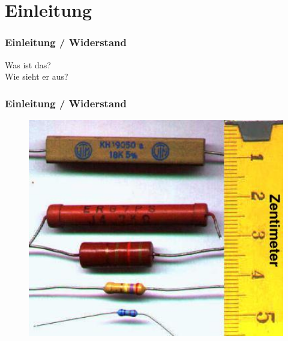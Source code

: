 

\subtitle{Technik Klasse E 04: \\
          Der Widerstand und seine Schaltungsarten \\[2em]}
\date{Stand 27.10.2014}



\section*{Einleitung}

\begin{frame}
    \frametitle{Einleitung / Widerstand}
    \begin{center}
        \Large{Was ist das?} \\
        \Large{Wie sieht er aus?}
    \end{center}
\end{frame}


\begin{frame}
    \frametitle{Einleitung / Widerstand}


  \begin{center}
    \begin{figure}
      \includegraphics[width=1\textwidth,height=.75\textheight,keepaspectratio]{e04/Widerstaende.jpg}
    \end{figure}
  \end{center}

 	

\end{frame}

